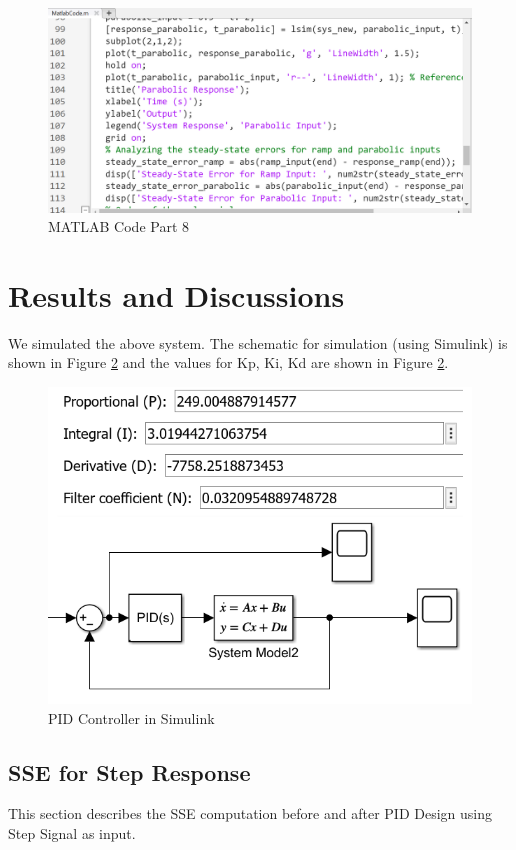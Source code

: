 \documentclass{article}
\begin{document}
\begin{figure}[h!]
	\centering
	\includegraphics[scale=0.65]{images/MatlabCode8.png}
	\caption{MATLAB Code Part 8}
	\label{fig:MatlabCode5}
\end{figure}


\section{Results and Discussions}
We simulated the above system. The schematic for simulation (using Simulink) is shown in Figure \ref{fig:PIDController} and the values for Kp, Ki, Kd are shown in Figure \ref{fig:PIDController}.

\begin{figure}[h!]
	\centering
	\includegraphics[scale=0.75]{images/PIDController.png}
	\caption{PID Controller in Simulink}
	\label{fig:PIDController}
\end{figure}


\subsection{SSE for Step Response}
\label{SSE_StepResponseSec}
This section describes the SSE computation before and after PID Design using Step Signal as input.
\end{document}
